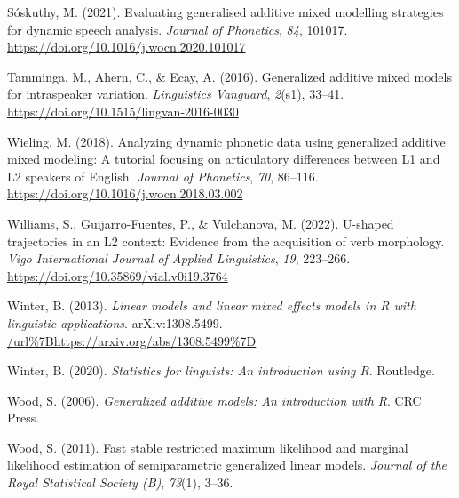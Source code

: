 \documentclass[
  letterpaper,
  DIV=11,
  numbers=noendperiod]{scrartcl}
\newlength{\cslhangindent}
\newenvironment{CSLReferences}[2] %
 {\begin{list}{}{%
  \setlength{\itemindent}{0pt}
  \setlength{\leftmargin}{0pt}
  \setlength{\parsep}{0pt}
  \ifodd #1
   \setlength{\leftmargin}{\cslhangindent}
   \setlength{\itemindent}{-1\cslhangindent}
  \fi
  \setlength{\itemsep}{#2\baselineskip}}}
 {\end{list}}
\begin{document}
\begin{CSLReferences}{1}{0}
Sóskuthy, M. (2021). Evaluating generalised additive mixed modelling
strategies for dynamic speech analysis. \emph{Journal of Phonetics},
\emph{84}, 101017. \url{https://doi.org/10.1016/j.wocn.2020.101017}

Tamminga, M., Ahern, C., \& Ecay, A. (2016). Generalized additive mixed
models for intraspeaker variation. \emph{Linguistics Vanguard},
\emph{2}(s1), 33--41. \url{https://doi.org/10.1515/lingvan-2016-0030}

Wieling, M. (2018). Analyzing dynamic phonetic data using generalized
additive mixed modeling: A tutorial focusing on articulatory differences
between {L}1 and {L}2 speakers of {E}nglish. \emph{Journal of
Phonetics}, \emph{70}, 86--116.
\url{https://doi.org/10.1016/j.wocn.2018.03.002}

Williams, S., Guijarro-Fuentes, P., \& Vulchanova, M. (2022). {U}-shaped
trajectories in an {L}2 context: Evidence from the acquisition of verb
morphology. \emph{Vigo International Journal of Applied Linguistics},
\emph{19}, 223--266. \url{https://doi.org/10.35869/vial.v0i19.3764}

Winter, B. (2013). \emph{Linear models and linear mixed effects models
in {R} with linguistic applications}. {a}rXiv:1308.5499.
\url{/url\%7Bhttps://arxiv.org/abs/1308.5499\%7D}

Winter, B. (2020). \emph{Statistics for linguists: An introduction using
{R}}. Routledge.

Wood, S. (2006). \emph{Generalized additive models: An introduction with
{R}}. CRC Press.

Wood, S. (2011). Fast stable restricted maximum likelihood and marginal
likelihood estimation of semiparametric generalized linear models.
\emph{Journal of the Royal Statistical Society (B)}, \emph{73}(1),
3--36.

\end{CSLReferences}
\end{document}
